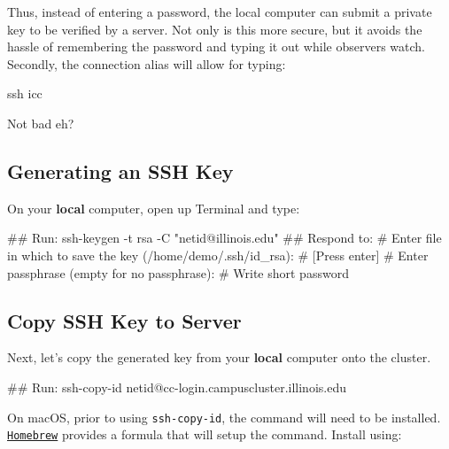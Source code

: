 \documentclass[
  letterpaper,
  DIV=11,
  numbers=noendperiod]{scrreport}
\newenvironment{Shaded}{\begin{snugshade}}{\end{snugshade}}
\newcommand{\AttributeTok}[1]{\textcolor[rgb]{0.40,0.45,0.13}{#1}}
\newcommand{\CommentTok}[1]{\textcolor[rgb]{0.37,0.37,0.37}{#1}}
\newcommand{\ExtensionTok}[1]{\textcolor[rgb]{0.00,0.23,0.31}{#1}}
\newcommand{\FunctionTok}[1]{\textcolor[rgb]{0.28,0.35,0.67}{#1}}
\newcommand{\NormalTok}[1]{\textcolor[rgb]{0.00,0.23,0.31}{#1}}
\newcommand{\StringTok}[1]{\textcolor[rgb]{0.13,0.47,0.30}{#1}}
\begin{document}
Thus, instead of entering a password, the local computer can submit a
private key to be verified by a server. Not only is this more secure,
but it avoids the hassle of remembering the password and typing it out
while observers watch. Secondly, the connection alias will allow for
typing:

\begin{Shaded}
\begin{Highlighting}[]
\FunctionTok{ssh}\NormalTok{ icc}
\end{Highlighting}
\end{Shaded}

Not bad eh?

\hypertarget{generating-an-ssh-key}{%
\subsection{Generating an SSH Key}\label{generating-an-ssh-key}}

On your \textbf{local} computer, open up Terminal and type:

\begin{Shaded}
\begin{Highlighting}[]
\CommentTok{\#\# Run:}
\FunctionTok{ssh{-}keygen} \AttributeTok{{-}t}\NormalTok{ rsa }\AttributeTok{{-}C} \StringTok{"netid@illinois.edu"}
\CommentTok{\#\# Respond to:}
\CommentTok{\# Enter file in which to save the key (/home/demo/.ssh/id\_rsa): \# [Press enter]}
\CommentTok{\# Enter passphrase (empty for no passphrase): \# Write short password}
\end{Highlighting}
\end{Shaded}

\hypertarget{copy-ssh-key-to-server}{%
\subsection{Copy SSH Key to Server}\label{copy-ssh-key-to-server}}

Next, let's copy the generated key from your \textbf{local} computer
onto the cluster.

\begin{Shaded}
\begin{Highlighting}[]
\CommentTok{\#\# Run:}
\ExtensionTok{ssh{-}copy{-}id}\NormalTok{ netid@cc{-}login.campuscluster.illinois.edu}
\end{Highlighting}
\end{Shaded}

On macOS, prior to using \texttt{ssh-copy-id}, the command will need to
be installed. \href{https://brew.sh/}{\texttt{Homebrew}} provides a
formula that will setup the command. Install using:
\end{document}
